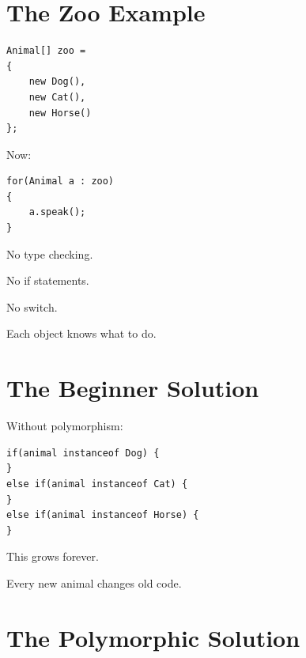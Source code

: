 \documentclass[11pt,a4paper]{book}
\begin{document}

\section{The Zoo Example}

\begin{verbatim}
Animal[] zoo =
{
    new Dog(),
    new Cat(),
    new Horse()
};
\end{verbatim}


Now:

\begin{verbatim}
for(Animal a : zoo)
{
    a.speak();
}
\end{verbatim}


No type checking.

No if statements.

No switch.


Each object knows what to do.

\newpage
\section{The Beginner Solution}

Without polymorphism:

\begin{verbatim}
if(animal instanceof Dog) {
}
else if(animal instanceof Cat) {
}
else if(animal instanceof Horse) {
}
\end{verbatim}


This grows forever.


Every new animal changes old code.


\section{The Polymorphic Solution}
\end{document}
